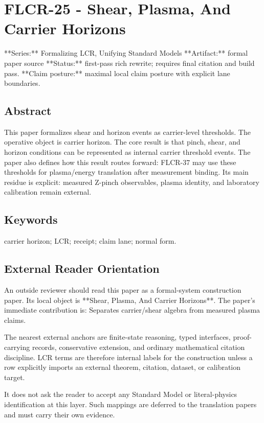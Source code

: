 \documentclass[11pt]{article}
\begin{document}
\section*{FLCR-25 - Shear, Plasma, And Carrier Horizons}

**Series:** Formalizing LCR, Unifying Standard Models
**Artifact:** formal paper source
**Status:** first-pass rich rewrite; requires final citation and build pass.
**Claim posture:** maximal local claim posture with explicit lane boundaries.

\subsection*{Abstract}

This paper formalizes shear and horizon events as carrier-level thresholds. The operative object is carrier horizon. The core result is that pinch, shear, and horizon conditions can be represented as internal carrier threshold events. The paper also defines how this result routes forward: FLCR-37 may use these thresholds for plasma/energy translation after measurement binding. Its main residue is explicit: measured Z-pinch observables, plasma identity, and laboratory calibration remain external.

\subsection*{Keywords}

carrier horizon; LCR; receipt; claim lane; normal form.

\subsection*{External Reader Orientation}

An outside reviewer should read this paper as a formal-system construction paper. Its local object is **Shear, Plasma, And Carrier Horizons**. The paper's immediate contribution is: Separates carrier/shear algebra from measured plasma claims.

The nearest external anchors are finite-state reasoning, typed interfaces, proof-carrying records, conservative extension, and ordinary mathematical citation discipline. LCR terms are therefore internal labels for the construction unless a row explicitly imports an external theorem, citation, dataset, or calibration target.

It does not ask the reader to accept any Standard Model or literal-physics identification at this layer. Such mappings are deferred to the translation papers and must carry their own evidence.
\end{document}
